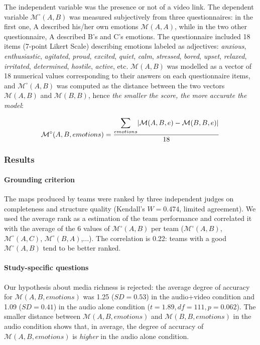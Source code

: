\documentclass[natbib]{svjour3}
\newcommand{\A}{A\xspace}
\newcommand{\B}{B\xspace}
\newcommand{\C}{C\xspace}
\newcommand{\M}[3]{{\mathcal{M}(#1, #2, #3)}}
\newcommand{\model}[3]{{$\mathcal{M}(#1, #2, #3)$}}
\newcommand{\gmodel}[2]{{$\mathcal{M}(#1, #2)$}}
\newcommand{\gModel}[2]{{$\mathcal{M}^{\circ}(#1, #2)$}}
\newcommand{\Mdeg}[3]{{\mathcal{M}^{\circ}(#1, #2, #3)}}
\DeclarePairedDelimiter\abs{\lvert}{\rvert}%
\begin{document}
The independent variable was the presence or not of a video link. The dependent
variable \gModel{A}{B} was measured subjectively from three questionnaires: in
the first one, \A described his/her own emotions \gmodel{A}{A}, while in the
two other questionnaire, \A described \B's and \C's emotions. The questionnaire
included 18 items (7-point Likert Scale) describing emotions labeled as
adjectives: \emph{anxious}, \emph{enthusiastic}, \emph{agitated}, \emph{proud},
\emph{excited}, \emph{quiet}, \emph{calm}, \emph{stressed}, \emph{bored},
\emph{upset}, \emph{relaxed}, \emph{irritated}, \emph{determined},
\emph{hostile}, \emph{active}, etc. \gmodel{A}{B} was modelled as a vector of 18
numerical values corresponding to their answers on each questionnaire items, and
\gModel{A}{B} was computed as the distance between the two vectors
\gmodel{A}{B} and \gmodel{B}{B}, hence \emph{the smaller the score, the more
accurate the model}:

\[
    \Mdeg{A}{B}{emotions} = \frac{\displaystyle\sum_{emotions} \abs{\M{A}{B}{e} -
    \M{B}{B}{e}}}{18}
\]


\subsubsection*{Results}

\paragraph{Grounding criterion} The maps produced by teams were ranked by three
independent judges on completeness and structure quality (Kendall's $W=0.474$,
limited agreement). We used the average rank as a estimation of the team
performance and correlated it with the average of the 6 values of \gModel{A}{B}
per team (\gModel{A}{B}, \gModel{A}{C}, \gModel{B}{A},...). The correlation is
0.22: teams with a good \gModel{A}{B} tend to be better ranked. 

\paragraph{Study-specific questions} Our hypothesis about media richness is
rejected: the average degree of accuracy for \model{A}{B}{emotions} was 1.25
($SD = 0.53$) in the audio+video condition and 1.09 ($SD = 0.41$) in the audio
alone condition ($t=1.89, df=111, p = 0.062$). The smaller distance between
\model{A}{B}{emotions} and \model{B}{B}{emotions} in the audio condition shows
that, in average, the degree of accuracy of \model{A}{B}{emotions} is
\emph{higher} in the audio alone condition.
\end{document}
